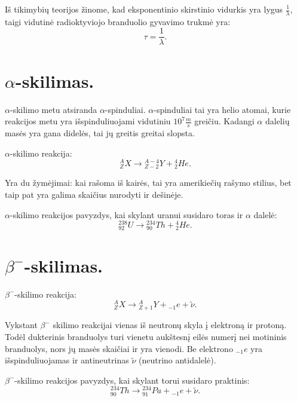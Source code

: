 Iš tikimybių teorijos žinome, kad eksponentinio skirstinio vidurkis
yra lygus $\frac{1}{\lambda}$, taigi vidutinė radioktyviojo
branduolio gyvavimo trukmė yra:
\begin{equation*}
  \tau = \frac{1}{\lambda}.
\end{equation*}

\section{$\alpha$-skilimas.}


$\alpha$-skilimo metu atsiranda $\alpha$-spinduliai. $\alpha$-spinduliai
tai yra helio atomai, kurie reakcijos metu yra išspinduliuojami
vidutiniu $10^{7} \frac{m}{s}$ greičiu. Kadangi $\alpha$ dalelių masės
yra gana didelės, tai jų greitis greitai slopsta.

$\alpha$-skilimo reakcija:
\begin{equation*}
  {}_{Z}^{A}X \to {}_{Z-2}^{A-4}Y + {}_{2}^{4}He.
\end{equation*}
\begin{note}
  Yra du žymėjimai: kai rašoma iš kairės, tai yra amerikiečių
  rašymo stilius, bet taip pat yra galima skaičius nurodyti ir
  dešinėje.
\end{note}

$\alpha$-skilimo reakcijos pavyzdys, kai skylant uranui susidaro toras
ir $\alpha$ dalelė:
\begin{equation*}
  {}_{92}^{238}U \to {}_{90}^{234}Th + {}_{2}^{4}He.
\end{equation*}

\section{$\beta^{-}$-skilimas.}

$\beta^{-}$-skilimo reakcija:
\begin{equation*}
  {}_{Z}^{A}X \to {}_{Z+1}^{A}Y + {}_{-1}e + \tilde{\nu}.
\end{equation*}

Vykstant $\beta^{-}$ skilimo reakcijai vienas iš neutronų skyla
į elektroną ir protoną. Todėl dukterinis branduolys turi vienetu
aukštesnį eilės numerį nei motininis branduolys, nors jų masės
skaičiai ir yra vienodi. Be elektrono ${}_{-1}e$ yra išspinduliuojamas
ir antineutrinas $\tilde{\nu}$ (neutrino antidalelė).

$\beta^{-}$-skilimo reakcijos pavyzdys, kai skylant torui susidaro
praktinis:
\begin{equation*}
  {}_{90}^{234}Th \to {}_{91}^{234}Pa + {}_{-1}e + \tilde{\nu}.
\end{equation*}

